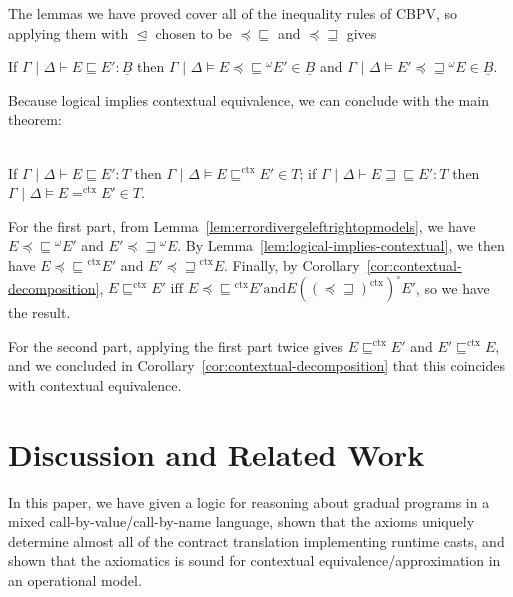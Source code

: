\documentclass[acmsmall,nonacm]{acmart}
\newif\iflong
\renewcommand{\u}{\underline}
\newcommand{\pipe}{\,\,|\,\,}
\newcommand{\ltdyn}{\sqsubseteq}
\newcommand{\gtdyn}{\sqsupseteq}
\newcommand{\precltdyn}{\mathrel{\preceq\ltdyn}}
\newcommand{\ltdynsucc}{\mathrel{\ltdyn\succeq}}
\newcommand{\equidyn}{\mathrel{\gtdyn\ltdyn}}
\newcommand{\apreorder}{\trianglelefteq}
\newcommand{\ctxize}[1]{\mathrel{{#1}^{\text{ctx}}}}
\newcommand{\ix}[2]{\mathrel{#1^{#2}}}
\newcommand\errordivergeleft[0]{\preceq\ltdyn}
\newcommand\errordivergerightop[0]{\preceq\gtdyn}
\begin{document}
{The lemmas we have proved cover all of the inequality rules of CBPV, so
applying them with $\apreorder$ chosen to be $\errordivergeleft$ and
$\errordivergerightop$ gives
\begin{lemma}[$\precltdyn$ and $\ltdynsucc$ are Models of CBPV] \label{lem:errordivergeleftrightopmodels}
  If $\Gamma \pipe \Delta \vdash E \ltdyn E' : \u B$ then 
  $\Gamma \pipe \Delta \vDash E \ix\precltdyn \omega E' \in \u B$ and
  $\Gamma \pipe \Delta \vDash E' \ix{\mathrel{\preceq\gtdyn}} \omega E \in \u B$.
\end{lemma}

Because logical implies contextual equivalence, we can
conclude with the main theorem:
\begin{theorem} ~~\\
  If $\Gamma \pipe \Delta \vdash E \ltdyn E' : T$ then
  $\Gamma \pipe \Delta \vDash E \ctxize\ltdyn E' \in T$;
  if
  ${\Gamma \pipe \Delta \vdash E \equidyn E' : T}$ then
  ${\Gamma \pipe \Delta \vDash E \ctxize= E' \in T}$.
\end{theorem}
\begin{longproof}

  
For the first part, from Lemma~\ref{lem:errordivergeleftrightopmodels},
we have $E \ix\precltdyn \omega E'$ and $E' \ix{\mathrel{\preceq\gtdyn}}
\omega E$.  By Lemma~\ref{lem:logical-implies-contextual}, we then have
$E \ctxize{\errordivergeleft} E'$ and $E' \ctxize{\errordivergerightop}
E$.  Finally, by Corollary~\ref{cor:contextual-decomposition}, $E
\ctxize\ltdyn E' \text{ iff } E \ctxize{\errordivergeleft} E' \text{and
} E (\ctxize{(\errordivergerightop)})^\circ E'$, so we have the result.


For the second part, applying the first part twice gives $E
\ctxize\ltdyn E'$ and $E' \ctxize\ltdyn E$, and we concluded in
Corollary~\ref{cor:contextual-decomposition} that this coincides with
contextual equivalence.
\end{longproof}

\section{Discussion and Related Work}
\label{sec:related}

In this paper, we have given a logic for reasoning about gradual
programs in a mixed call-by-value/call-by-name language, shown that
the axioms uniquely determine almost all of the contract translation
implementing runtime casts, and shown that the axiomatics is sound for
contextual equivalence/approximation in an operational model.
\iflong

}
\end{document}
